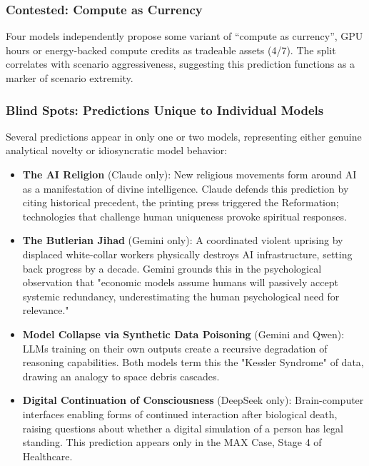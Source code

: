 \documentclass[preprint,review,12pt]{elsarticle}
\begin{document}
\subsubsection{Contested: Compute as Currency}
\label{sec:compute_currency}

Four models independently propose some variant of ``compute as currency'', GPU hours or energy-backed compute credits as tradeable assets (4/7). The split correlates with scenario aggressiveness, suggesting this prediction functions as a marker of scenario extremity.


\subsubsection{Blind Spots: Predictions Unique to Individual Models}
\label{sec:blind_spots}

Several predictions appear in only one or two models, representing either genuine analytical novelty or idiosyncratic model behavior:

\begin{itemize}
 \item \textbf{The AI Religion} (Claude only): New religious movements form around AI as a manifestation of divine intelligence. Claude defends this prediction by citing historical precedent, the printing press triggered the Reformation; technologies that challenge human uniqueness provoke spiritual responses.
 \item \textbf{The Butlerian Jihad} (Gemini only): A coordinated violent uprising by displaced white-collar workers physically destroys AI infrastructure, setting back progress by a decade. Gemini grounds this in the psychological observation that "economic models assume humans will passively accept systemic redundancy, underestimating the human psychological need for relevance."
 \item \textbf{Model Collapse via Synthetic Data Poisoning} (Gemini and Qwen): LLMs training on their own outputs create a recursive degradation of reasoning capabilities. Both models term this the "Kessler Syndrome" of data, drawing an analogy to space debris cascades.
 \item \textbf{Digital Continuation of Consciousness} (DeepSeek only): Brain-computer interfaces enabling forms of continued interaction after biological death, raising questions about whether a digital simulation of a person has legal standing. This prediction appears only in the MAX Case, Stage 4 of Healthcare.

\end{itemize}
\end{document}
